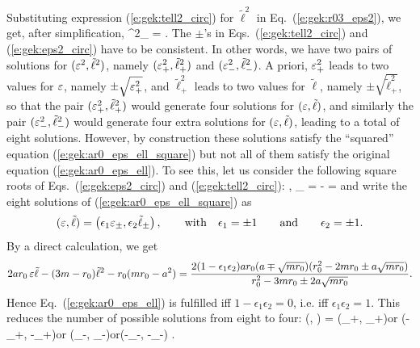 Substituting expression (\ref{e:gek:tell2_circ})
for $\tilde{\ell}^2$ in Eq.~(\ref{e:gek:r03_eps2}), we get,
after simplification,
\be \label{e:gek:eps2_circ}
    \veps^2_{\pm} =  .
\ee
The $\pm$'s in Eqs.~(\ref{e:gek:tell2_circ}) and (\ref{e:gek:eps2_circ}) have
to be consistent. In other words, we have two pairs of solutions for
$(\varepsilon^2, \tilde{\ell}^2)$, namely $(\varepsilon_+^2, \tilde{\ell}_+^2)$
and $(\varepsilon_-^2, \tilde{\ell}_-^2)$.
A priori, $\varepsilon_+^2$ leads to two values for $\varepsilon$, namely $\pm\sqrt{\varepsilon_+^2}$,
and $\tilde{\ell}_+^2$ leads to two values for $\tilde{\ell}$, namely $\pm\sqrt{\tilde{\ell}_+^2}$,
so that the pair $(\varepsilon_+^2, \tilde{\ell}_+^2)$ would generate four solutions
for $(\varepsilon, \tilde{\ell})$, and similarly the pair $(\varepsilon_-^2, \tilde{\ell}_-^2)$ would generate four extra solutions for $(\varepsilon, \tilde{\ell})$, leading to a total of eight solutions.
However, by construction these solutions satisfy the ``squared'' equation (\ref{e:gek:ar0_eps_ell_square})
but not all of them satisfy the original equation (\ref{e:gek:ar0_eps_ell}).
To see this, let us consider the following square roots of Eqs.~(\ref{e:gek:eps2_circ})
and (\ref{e:gek:tell2_circ}):
\be \label{e:gek:veps_circ}
    ,
\ee
\be \label{e:gek:tell_circ}
    \tilde{\ell}_{\pm} = -  = 
\ee
and write the eight solutions of (\ref{e:gek:ar0_eps_ell_square}) as
\[
    (\varepsilon, \tilde{\ell}) = \left( \epsilon_1 \varepsilon_\pm, \epsilon_2 \tilde{\ell}_\pm \right) ,
    \qquad\mbox{with}\quad \epsilon_1 = \pm 1\qquad\mbox{and}\qquad \epsilon_2 = \pm 1.
\]
By a direct calculation, we get
\[
    2 a r_0 \, \varepsilon\tilde{\ell} - (3m - r_0) \tilde{\ell}^2 - r_0 ( m r_0 - a^2)
    =  \frac{2(1 - \epsilon_1 \epsilon_2) a r_0 (a \mp \sqrt{m r_0}) (r_0^2 - 2m r_0 \pm a\sqrt{m r_0})}{r_0^2 - 3m r_0 \pm 2 a \sqrt{m r_0}} .
\]
Hence Eq.~(\ref{e:gek:ar0_eps_ell}) is fulfilled iff $ 1 - \epsilon_1 \epsilon_2 = 0$, i.e.
iff $\epsilon_1 \epsilon_2 = 1$.
This reduces the number of possible solutions from eight to four:
\be \label{e:gek:circ_four_sol}
    (\veps, \tilde{\ell}) = (\veps_+, \tilde{\ell}_+)\quad\mbox{or}\quad
        (-\veps_+, -\tilde{\ell}_+)\quad\mbox{or}\quad
        (\veps_-, \tilde{\ell}_-)\quad\mbox{or}\quad  (-\veps_-, -\tilde{\ell}_-) .
